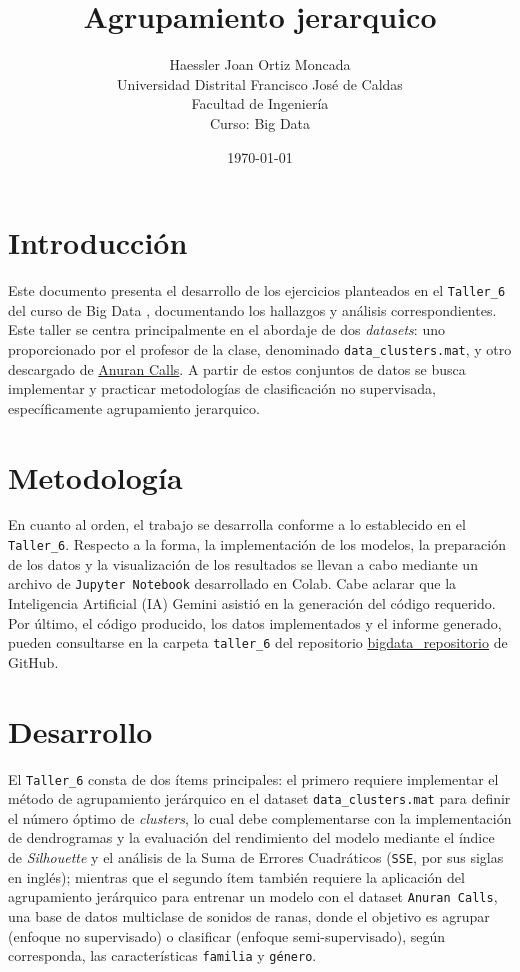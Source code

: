 \documentclass[12pt,a4paper]{article}
\title{\textbf{Agrupamiento jerarquico}}
\author{Haessler Joan Ortiz Moncada \\[0.5cm]
        Universidad Distrital Francisco José de Caldas \\
        Facultad de Ingeniería \\
        Curso: Big Data}
\date{\today}
\begin{document}
\maketitle

\section{Introducción}
Este documento presenta el desarrollo de los ejercicios planteados en el \texttt{Taller\_6} 
del curso de Big Data , documentando los hallazgos y análisis correspondientes. Este taller se 
centra principalmente en el abordaje de dos \textit{\textit{datasets}}: uno proporcionado por el profesor de la clase, 
denominado \texttt{data\_clusters.mat}, y otro descargado de \href{http://archive.ics.uci.edu/dataset/406/anuran+calls+mfccs}{Anuran Calls}. 
A partir de estos conjuntos de datos se busca implementar y practicar metodologías de clasificación no supervisada, específicamente 
agrupamiento jerarquico.

\section{Metodología}
En cuanto al orden, el trabajo se desarrolla conforme a lo establecido en el \texttt{Taller\_6}. 
Respecto a la forma, la implementación de los modelos, la preparación de los datos y la visualización de 
los resultados se llevan a cabo mediante un archivo de \texttt{Jupyter Notebook} desarrollado en Colab. 
Cabe aclarar que la Inteligencia Artificial (IA) Gemini asistió en la generación del código requerido. 
Por último, el código producido, los datos implementados y el informe generado, pueden consultarse en la 
carpeta \texttt{taller\_6} del repositorio \href{https://github.com/HaesslerOrtiz/bigdata}{bigdata\_repositorio} 
de GitHub.

\section{Desarrollo}
El \texttt{Taller\_6} consta de dos ítems principales: el primero requiere implementar el método de agrupamiento jerárquico 
en el dataset \texttt{data\_clusters.mat} para definir el número óptimo de \textit{clusters}, lo cual debe complementarse con la 
implementación de dendrogramas y la evaluación del rendimiento del modelo mediante el índice de \textit{Silhouette} 
y el análisis de la Suma de Errores Cuadráticos (\texttt{SSE}, por sus siglas en inglés); mientras que el segundo ítem también requiere 
la aplicación del agrupamiento jerárquico para entrenar un modelo con el dataset \texttt{Anuran Calls}, una base de datos multiclase de 
sonidos de ranas, donde el objetivo es agrupar (enfoque no supervisado) o clasificar (enfoque semi-supervisado), según 
corresponda, las características \texttt{familia} y \texttt{género}.
\end{document}
